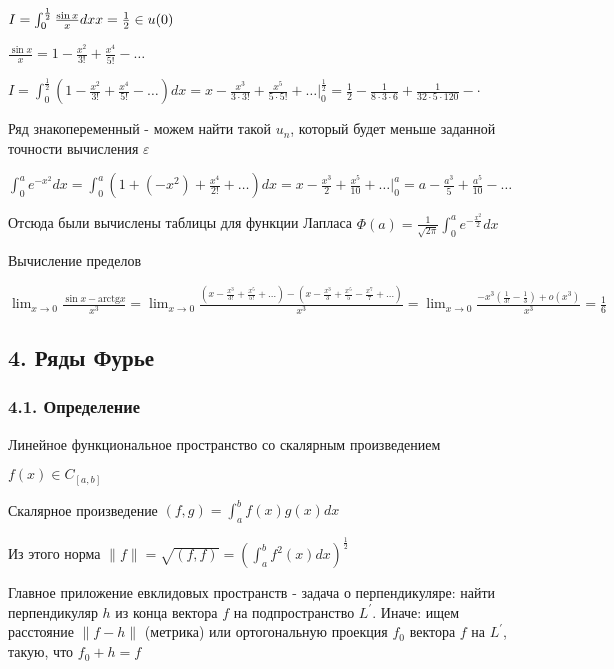 \documentclass[12pt]{article}
\begin{document}
     $I = \int_0^{\frac{1}{2}} \frac{\sin x}{x} dx \hfill x = \frac{1}{2} \in u(0)$

    $\frac{\sin x}{x} = 1 - \frac{x^2}{3!} + \frac{x^4}{5!} - \dots$

    $I = \int_0^{\frac{1}{2}} (1 - \frac{x^2}{3!} + \frac{x^4}{5!} - \dots) dx = x - \frac{x^3}{3 \cdot 3!} + \frac{x^5}{5 \cdot 5!} + \dots \Big|_{0}^{\frac{1}{2}} = 
    \frac{1}{2} - \frac{1}{8 \cdot 3 \cdot 6} + \frac{1}{32 \cdot 5 \cdot 120} - \cdot$

    Ряд знакопеременный - можем найти такой $u_n$, который будет меньше заданной точности вычисления $\varepsilon$

     $\int_0^{a} e^{-x^2} dx = \int_0^a (1 + (-x^2) + \frac{x^4}{2!} + \dots) dx = x - \frac{x^3}{2} + \frac{x^5}{10} + \dots \Big|_0^a = a - \frac{a^3}{5} + \frac{a^5}{10} - \dots$

    Отсюда были вычислены таблицы для функции Лапласа $\Phi(a) = \frac{1}{\sqrt{2\pi}} \int_0^a e^{-\frac{x^2}{2}} dx$

     Вычисление пределов

    $\lim_{x \to 0} \frac{\sin x - \mathrm{arctg} x}{x^3} = \lim_{x \to 0} \frac{(x - \frac{x^3}{3!} + \frac{x^5}{5!} + \dots) - (x - \frac{x^3}{3} + \frac{x^5}{5} - \frac{x^7}{7} + \dots)}{x^3} = 
    \lim_{x \to 0} \frac{-x^3 (\frac{1}{3!} - \frac{1}{3}) + o(x^3)}{x^3} = \frac{1}{6}$

    \subsection{4. Ряды Фурье}

    \subsubsection{4.1. Определение}

    \Mem Линейное функциональное пространство со скалярным произведением

    $f(x) \in C_{[a,b]}$

    Скалярное произведение $(f, g) = \int_a^b f(x)g(x) dx$

    Из этого норма $\|f\| = \sqrt{(f,f)} = \left(\int_a^b f^2(x) dx\right)^\frac{1}{2}$

    Главное приложение евклидовых пространств - задача о перпендикуляре: найти перпендикуляр $h$ из конца вектора $f$ на подпространство $L^\prime$.
    Иначе: ищем расстояние $\|f - h\|$ (метрика) или ортогональную проекция $f_0$ вектора $f$ на $L^\prime$, такую, что $f_0 + h = f$
\end{document}
